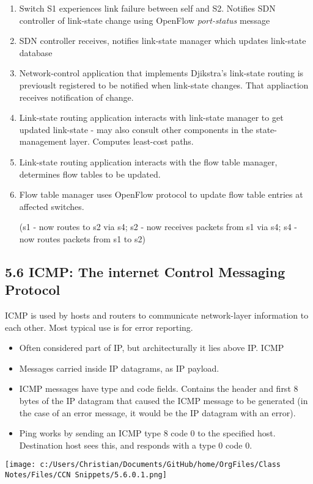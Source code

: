 \documentclass[11pt]{article}
\begin{document}
\begin{enumerate}
\item Switch S1 experiences link failure between self and S2. Notifies SDN controller of link-state change using OpenFlow \emph{port-status} message
\item SDN controller receives, notifies link-state manager which updates link-state database
\item Network-control application that implements Djikstra's link-state routing is previouslt registered to be notified when link-state changes. That appliaction receives notification of change.
\item Link-state routing application interacts with link-state manager to get updated link-state - may also consult other components in the state-management layer. Computes least-cost paths.
\item Link-state routing application interacts with the flow table manager, determines flow tables to be updated.
\item Flow table manager uses OpenFlow protocol to update flow table entries at affected switches.

(s1 - now routes to s2 via s4; s2 - now receives packets from s1 via s4; s4 - now routes packets from s1 to s2)
\end{enumerate}

\subsection{5.6 ICMP: The internet Control Messaging Protocol}
\label{sec:org12c5f19}
ICMP is used by hosts and routers to communicate network-layer information to each other. Most typical use is for error reporting.

\begin{itemize}
\item Often considered part of IP, but architecturally it lies above IP. ICMP
\item Messages carried inside IP datagrams, as IP payload.
\item ICMP messages have type and code fields. Contains the header and first 8 bytes of the IP datagram that caused the ICMP message to be generated (in the case of an error message, it would be the IP datagram with an error).
\item Ping works by sending an ICMP type 8 code 0 to the specified host. Destination host sees this, and responds with a type 0 code 0.
\end{itemize}
\begin{center}
\texttt{[image: c:/Users/Christian/Documents/GitHub/home/OrgFiles/Class Notes/Files/CCN Snippets/5.6.0.1.png]}
\end{center}
\end{document}
